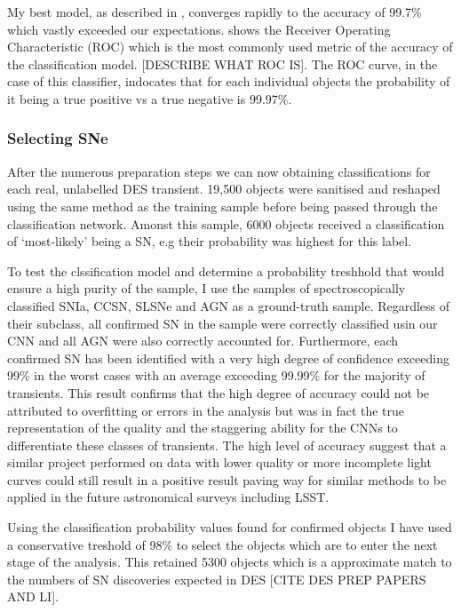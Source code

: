 My best model, as described in , converges rapidly to the accuracy of 99.7\% which vastly exceeded our expectations.  shows the Receiver Operating Characteristic (ROC) which is the most commonly used metric of the accuracy of the classification model. [DESCRIBE WHAT ROC IS]. The ROC curve, in the case of this classifier, indocates that for each individual objects the probability of it being a true positive vs a true negative is 99.97\%.

\begin{figure}
  \caption{}
  \label{fig:AGNNoiseROC}
\end{figure}

\subsubsection{Selecting SNe}
After the numerous preparation steps we can now obtaining classifications for each real, unlabelled DES transient. 19,500 objects were sanitised and reshaped using the same method as the training sample before being passed through the classification network. Amonst this sample, 6000 objects received a classification of `most-likely' being a SN, e.g their probability was highest for this label.

To test the clssification model and determine a probability treshhold that would ensure a high purity of the sample, I use the samples of spectroscopically classified SNIa, CCSN, SLSNe and AGN as a ground-truth sample. Regardless of their subclass, all confirmed SN in the sample were correctly classified usin our CNN and all AGN were also correctly accounted for. Furthermore, each confirmed SN has been identified with a very high degree of confidence exceeding 99\% in the worst cases with an average exceeding 99.99\% for the majority of transients. This result confirms that the high degree of accuracy could not be attributed to overfitting or errors in the analysis but was in fact the true representation of the quality and the staggering ability for the CNNs to differentiate these classes of transients. The high level of accuracy suggest that a similar project performed on data with lower quality or more incomplete light curves could still result in a positive result paving way for similar methods to be applied in the future astronomical surveys including LSST.

Using the classification probability values found for confirmed objects I have used a conservative treshold of 98\% to select the objects which are to enter the next stage of the analysis. This retained 5300 objects which is a approximate match to the numbers of SN discoveries expected in DES [CITE DES PREP PAPERS AND LI].

